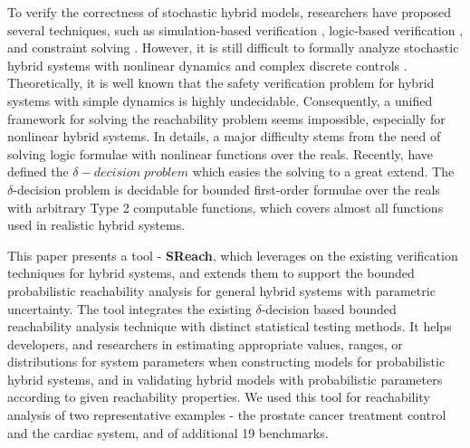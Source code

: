 To verify the correctness of stochastic hybrid models, researchers have proposed several techniques, such as simulation-based verification \cite{zuliani2010bayesian, abate2007probabilistic}, logic-based verification \cite{platzer2011stochastic}, and constraint solving \cite{franzle2008stochastic}. However, it is still difficult to formally analyze stochastic hybrid systems with nonlinear dynamics and complex discrete controls \cite{alur2011formal, henzinger2000theory}. Theoretically, it is well known that the safety verification problem for hybrid systems with simple dynamics is highly undecidable. Consequently, a unified framework for solving the reachability problem seems impossible, especially for nonlinear hybrid systems. In details, a major difficulty stems from the need of solving logic formulae with nonlinear functions over the reals. Recently, \cite{gao2013dreal, gao2012dreal} have defined the $\delta-decision \;  problem$ which easies the solving to a great extend. The $\delta$-decision problem is decidable for bounded first-order formulae over the reals with arbitrary Type 2 computable functions, which covers almost all functions used in realistic hybrid systems.   

This paper presents a tool - {\bf SReach}, which leverages on the existing verification techniques for hybrid systems, and extends them to support the bounded probabilistic reachability analysis for general hybrid systems with parametric uncertainty. The tool integrates the existing $\delta$-decision based bounded reachability analysis technique \cite{gaodelta} with distinct statistical testing methods. It helps developers, and researchers in estimating appropriate values, ranges, or distributions for system parameters when constructing models for probabilistic hybrid systems, and in validating hybrid models with probabilistic parameters according to given reachability properties. We used this tool for reachability analysis of two representative examples - the prostate cancer treatment control and the cardiac system, and of additional 19 benchmarks.